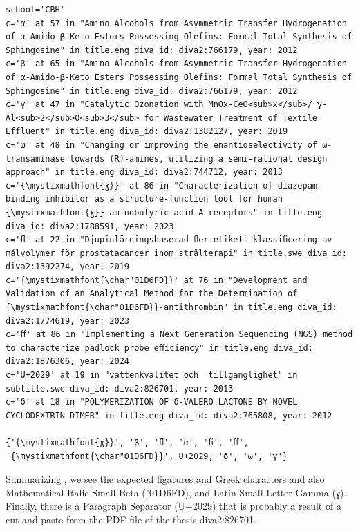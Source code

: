 \documentclass[12pt, twoside]{article}
\begin{document}
\begin{lstlisting}[style=latexExampleForAuthors,  escapechar=|, 
caption={Part of the output about characters missing from Figtree that are actually used in DiVA in English and Swedish titles and subtitles - for the CBH school.},
label=lst:missingFigtreeCBH]
\end{lstlisting}
\begin{Verbatim}[breaklines=true, commandchars=\\\{\}]
school='CBH'
c='α' at 57 in "Amino Alcohols from Asymmetric Transfer Hydrogenation of α-Amido-β-Keto Esters Possessing Olefins: Formal Total Synthesis of Sphingosine" in title.eng diva_id: diva2:766179, year: 2012
c='β' at 65 in "Amino Alcohols from Asymmetric Transfer Hydrogenation of α-Amido-β-Keto Esters Possessing Olefins: Formal Total Synthesis of Sphingosine" in title.eng diva_id: diva2:766179, year: 2012
c='γ' at 47 in "Catalytic Ozonation with MnOx-CeO<sub>x</sub>/ γ-Al<sub>2</sub>O<sub>3</sub> for Wastewater Treatment of Textile Effluent" in title.eng diva_id: diva2:1382127, year: 2019
c='ω' at 48 in "Changing or improving the enantioselectivity of ω-transaminase towards (R)-amines, utilizing a semi-rational design approach" in title.eng diva_id: diva2:744712, year: 2013
c='{\mystixmathfont{ɣ}}' at 86 in "Characterization of diazepam binding inhibitor as a structure-function tool for human {\mystixmathfont{ɣ}}-aminobutyric acid-A receptors" in title.eng diva_id: diva2:1788591, year: 2023
c='ﬂ' at 22 in "Djupinlärningsbaserad ﬂer-etikett klassiﬁcering av målvolymer för prostatacancer inom strålterapi" in title.swe diva_id: diva2:1392274, year: 2019
c='{\mystixmathfont{\char"01D6FD}}' at 76 in "Development and Validation of an Analytical Method for the Determination of {\mystixmathfont{\char"01D6FD}}-antithrombin" in title.eng diva_id: diva2:1774619, year: 2023
c='ﬀ' at 86 in "Implementing a Next Generation Sequencing (NGS) method to characterize padlock probe eﬀiciency" in title.eng diva_id: diva2:1876306, year: 2024
c='U+2029' at 19 in "vattenkvalitet och  tillgänglighet" in subtitle.swe diva_id: diva2:826701, year: 2013
c='δ' at 18 in "POLYMERIZATION OF δ-VALERO LACTONE BY NOVEL CYCLODEXTRIN DIMER" in title.eng diva_id: diva2:765808, year: 2012

{'{\mystixmathfont{ɣ}}', 'β', 'ﬂ', 'α', 'ﬁ', 'ﬀ', '{\mystixmathfont{\char"01D6FD}}', U+2029, 'δ', 'ω', 'γ'}
\end{Verbatim}
\FloatBarrier

Summarizing , we see the expected ligatures and Greek characters and also Mathematical Italic Small Beta ({\mystixmathfont\char"01D6FD}), and Latin Small Letter Gamma ({\mystixmathfont γ}). Finally, there is a Paragraph Separator (U+2029) that is probably a result of a cut and paste from the PDF file of the thesis diva2:826701.
\clearpage
\end{document}
